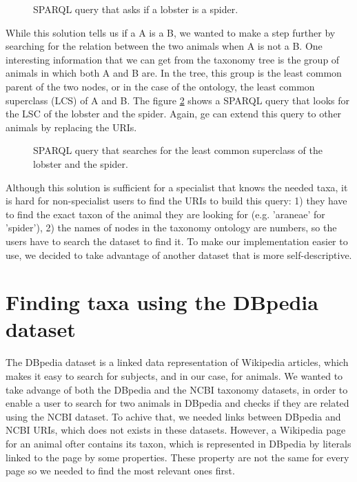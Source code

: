 \documentclass{article}
\begin{document}
\begin{figure}[h]

\caption{SPARQL query that asks if a lobster is a spider.}
\label{lst:sparql_subClassOf}
\end{figure}

While this solution tells us if a A is a B, we wanted to make a step further by searching for the relation between the two animals when A is not a B. One interesting information that we can get from the taxonomy tree is the group of animals in which both A and B are. In the tree, this group is the least common parent of the two nodes, or in the case of the ontology, the least common superclass (LCS) of A and B. The figure \ref{lst:sparql_lcs} shows a SPARQL query that looks for the LSC of the lobster and the spider. Again, ge can extend this query to other animals by replacing the URIs.

\begin{figure}[h]

\caption{SPARQL query that searches for the least common superclass of the lobster and the spider.}
\label{lst:sparql_lcs}
\end{figure}

Although this solution is sufficient for a specialist that knows the needed taxa, it is hard for non-specialist users to find the URIs to build this query: 1) they have to find the exact taxon of the animal they are looking for (e.g. 'araneae' for 'spider'), 2) the names of nodes in the taxonomy ontology are numbers, so the users have to search the dataset to find it. To make our implementation easier to use, we decided to take advantage of another dataset that is more self-descriptive.

\section{Finding taxa using the DBpedia dataset}

The DBpedia dataset is a linked data representation of Wikipedia articles, which makes it easy to search for subjects, and in our case, for animals. We wanted to take advange of both the DBpedia and the NCBI taxonomy datasets, in order to enable a user to search for two animals in DBpedia and checks if they are related using the NCBI dataset. To achive that, we needed links between DBpedia and NCBI URIs, which does not exists in these datasets. However, a Wikipedia page for an animal ofter contains its taxon, which is represented in DBpedia by literals linked to the page by some properties. These property are not the same for every page so we needed to find the most relevant ones first.
\\
\end{document}
